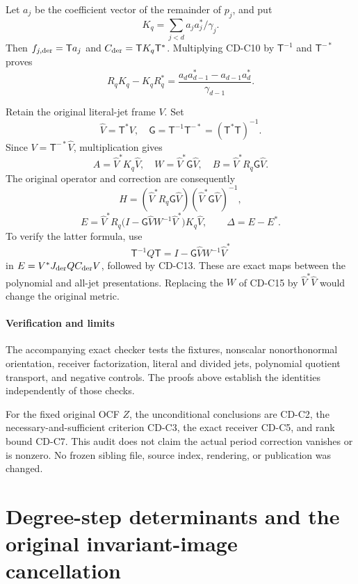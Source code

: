 \documentclass[11pt]{article}
\begin{document}
Let \(a_j\) be the coefficient vector of the remainder of \(p_j\), and put \[
K_q=\sum_{j<d}a_ja_j^*/\gamma_j.
\] Then \(f_{j,\rm der}=\mathsf T a_j\) and \(C_{\rm der}=\mathsf T K_q\mathsf T^*\). Multiplying CD-C10 by \(\mathsf T^{-1}\) and \(\mathsf T^{-*}\) proves \[
R_qK_q-K_qR_q^*
=\frac{a_da_{d-1}^*-a_{d-1}a_d^*}{\gamma_{d-1}}.
\tag{CD-C14}
\]

Retain the original literal-jet frame \(V\). Set \[
\widehat V=\mathsf T^*V,\quad
\mathsf G=\mathsf T^{-1}\mathsf T^{-*}=(\mathsf T^*\mathsf T)^{-1}.
\] Since \(V=\mathsf T^{-*}\widehat V\), multiplication gives \[
A=\widehat V^*K_q\widehat V,\quad
W=\widehat V^*\mathsf G\widehat V,\quad
B=\widehat V^*R_q\mathsf G\widehat V.
\tag{CD-C15}
\] The original operator and correction are consequently \[
H=(\widehat V^*R_q\mathsf G\widehat V)
(\widehat V^*\mathsf G\widehat V)^{-1},
\] \[
E=\widehat V^*R_q
\bigl(I-\mathsf G\widehat VW^{-1}\widehat V^*\bigr)
K_q\widehat V,\qquad \Delta=E-E^*.
\tag{CD-C16}
\] To verify the latter formula, use \[
\mathsf T^{-1}Q\mathsf T
=I-\mathsf G\widehat VW^{-1}\widehat V^*
\] in \(E=V^*J_{\rm der}QC_{\rm der}V\), followed by CD-C13. These are exact maps between the polynomial and all-jet presentations. Replacing the \(W\) of CD-C15 by \(\widehat V^*\widehat V\) would change the original metric.

\subsection{Verification and limits}\label{cdaudit:verification-and-limits}

The accompanying exact checker tests the fixtures, nonscalar nonorthonormal orientation, receiver factorization, literal and divided jets, polynomial quotient transport, and negative controls. The proofs above establish the identities independently of those checks.

For the fixed original OCF \(Z\), the unconditional conclusions are CD-C2, the necessary-and-sufficient criterion CD-C3, the exact receiver CD-C5, and rank bound CD-C7. This audit does not claim the actual period correction vanishes or is nonzero. No frozen sibling file, source index, rendering, or publication was changed.

\endgroup

\clearpage\begingroup
\part*{Degree-step determinants and the original invariant-image cancellation}
\newcommand{\dsrootC}{\mathbb C}
\newcommand{\dsrootR}{\mathbb R}
\newcommand{\dsrootcalD}{\mathscr D}
\end{document}
